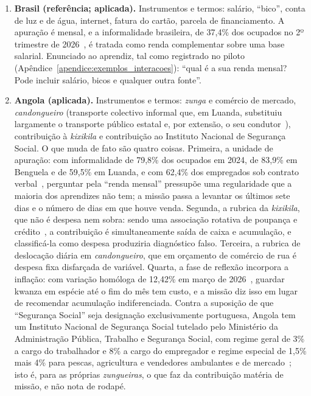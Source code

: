 \begin{enumerate}
\item[(a)] \textbf{Brasil (referência; aplicada).} Instrumentos e termos: salário, ``bico'', conta de luz e de água, internet, fatura do cartão, parcela de financiamento. A apuração é mensal, e a informalidade brasileira, de 37,4\% dos ocupados no 2º trimestre de 2026~\cite{ibge2026pnad}, é tratada como renda complementar sobre uma base salarial. Enunciado ao aprendiz, tal como registrado no piloto (Apêndice~\ref{apendice:exemplos_interacoes}): ``qual é a sua renda mensal? Pode incluir salário, bicos e qualquer outra fonte''.

\item[(b)] \textbf{Angola (aplicada).} Instrumentos e termos: \textit{zunga} e comércio de mercado, \textit{candongueiro} (transporte colectivo informal que, em Luanda, substituiu largamente o transporte público estatal e, por extensão, o seu condutor~\cite{lopes2006candongueiros}), contribuição à \textit{kixikila} e contribuição ao Instituto Nacional de Segurança Social. O que muda de fato são quatro coisas. Primeira, a unidade de apuração: com informalidade de 79,8\% dos ocupados em 2024, de 83,9\% em Benguela e de 59,5\% em Luanda, e com 62,4\% dos empregados sob contrato verbal~\cite{ineangola2024emprego}, perguntar pela ``renda mensal'' pressupõe uma regularidade que a maioria dos aprendizes não tem; a missão passa a levantar os últimos sete dias e o número de dias em que houve venda. Segunda, a rubrica da \textit{kixikila}, que não é despesa nem sobra: sendo uma associação rotativa de poupança e crédito~\cite{carlos2014kixikila,ardener1964}, a contribuição é simultaneamente saída de caixa e acumulação, e classificá-la como despesa produziria diagnóstico falso. Terceira, a rubrica de deslocação diária em \textit{candongueiro}, que em orçamento de comércio de rua é despesa fixa disfarçada de variável. Quarta, a fase de reflexão incorpora a inflação: com variação homóloga de 12,42\% em março de 2026~\cite{ineangola2026ipcn}, guardar kwanza em espécie até o fim do mês tem custo, e a missão diz isso em lugar de recomendar acumulação indiferenciada. Contra a suposição de que ``Segurança Social'' seja designação exclusivamente portuguesa, Angola tem um Instituto Nacional de Segurança Social tutelado pelo Ministério da Administração Pública, Trabalho e Segurança Social, com regime geral de 3\% a cargo do trabalhador e 8\% a cargo do empregador e regime especial de 1,5\% mais 4\% para pescas, agricultura e vendedores ambulantes e de mercado~\cite{maptss2026inss}; isto é, para as próprias \textit{zungueiras}, o que faz da contribuição matéria de missão, e não nota de rodapé.


\end{enumerate}

